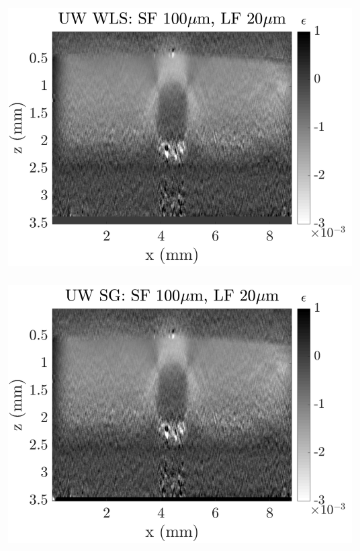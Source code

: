 \begin{figure}[h]
	\centering
    \begin{subfigure}{0.49\textwidth}
    	\centering
	    \includegraphics[width=\textwidth]{appendix_figs/wls_fr100_lr20.png}
    \end{subfigure}
    \begin{subfigure}{0.49\textwidth}
    	\centering
        \includegraphics[width=\textwidth]{appendix_figs/uwsg_fr100_lr20.png}
    \end{subfigure}
    \\
    \begin{subfigure}{0.49\textwidth}
    	\centering

\end{subfigure}
\end{figure}
